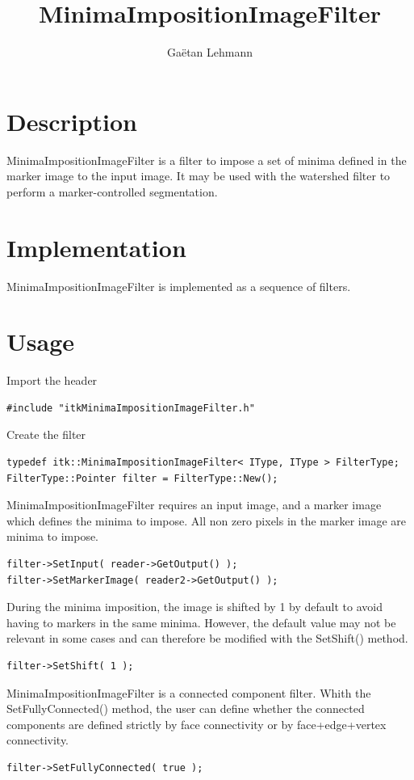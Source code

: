 \documentclass[IJ]{cesj}
\author{Ga\"etan Lehmann}
\institute{Biologie du d\'eveloppement et de la reproduction, INRA de Jouy-en-Josas}
\title{MinimaImpositionImageFilter}
\begin{document}
\lstset{language=c++}
\maketitle

\section{Description}
MinimaImpositionImageFilter is a filter to impose a set of minima defined in the marker image to the input image. It may be used with the watershed filter to perform a marker-controlled segmentation.

\section{Implementation}
MinimaImpositionImageFilter is implemented as a sequence of filters.

\section{Usage}
Import the header
\begin{lstlisting}
#include "itkMinimaImpositionImageFilter.h"
\end{lstlisting}
Create the filter
\begin{lstlisting}
typedef itk::MinimaImpositionImageFilter< IType, IType > FilterType;
FilterType::Pointer filter = FilterType::New();
\end{lstlisting}
MinimaImpositionImageFilter requires an input image, and a marker image which defines the minima to impose. All non zero pixels in the marker image are minima to impose.
\begin{lstlisting}
filter->SetInput( reader->GetOutput() );
filter->SetMarkerImage( reader2->GetOutput() );
\end{lstlisting}
During the minima imposition, the image is shifted by 1 by default to avoid having to markers in the same minima. However, the default value may not be relevant in some cases and can therefore be modified with the SetShift() method.
\begin{lstlisting}
filter->SetShift( 1 );
\end{lstlisting}
MinimaImpositionImageFilter is a connected component filter. Whith the SetFullyConnected() method, the user can define whether the connected components are defined strictly by face connectivity or by face+edge+vertex connectivity.
\begin{lstlisting}
filter->SetFullyConnected( true );
\end{lstlisting}
\end{document}
